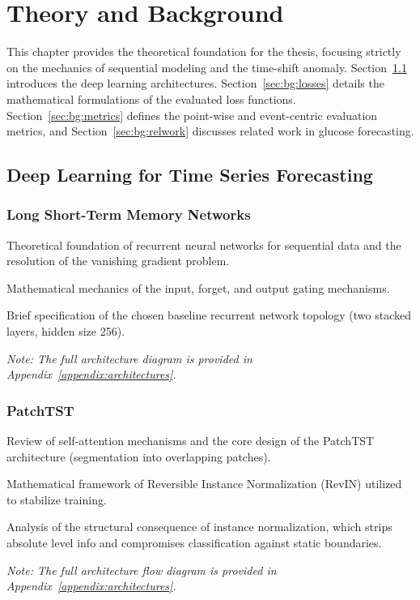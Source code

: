 \chapter{Theory and Background} \label{ch:background}
This chapter provides the theoretical foundation for the thesis, focusing strictly on the mechanics of sequential modeling and the time-shift anomaly. Section~\ref{sec:bg:models} introduces the deep learning architectures. Section~\ref{sec:bg:losses} details the mathematical formulations of the evaluated loss functions. Section~\ref{sec:bg:metrics} defines the point-wise and event-centric evaluation metrics, and Section~\ref{sec:bg:relwork} discusses related work in glucose forecasting.

\section{Deep Learning for Time Series Forecasting} \label{sec:bg:models}
\subsection{Long Short-Term Memory Networks} \label{sec:bg:models:lstm}
\begin{planned}
    \item Theoretical foundation of recurrent neural networks for sequential data and the resolution of the vanishing gradient problem.
    \item Mathematical mechanics of the input, forget, and output gating mechanisms.
    \item Brief specification of the chosen baseline recurrent network topology (two stacked layers, hidden size 256). 
    \item \textit{Note: The full architecture diagram is provided in Appendix~\ref{appendix:architectures}.}
\end{planned}

\subsection{PatchTST} \label{sec:bg:models:patchtst}
\begin{planned}
    \item Review of self-attention mechanisms and the core design of the PatchTST architecture (segmentation into overlapping patches).
    \item Mathematical framework of Reversible Instance Normalization (RevIN) utilized to stabilize training.
    \item Analysis of the structural consequence of instance normalization, which strips absolute level info and compromises classification against static boundaries.
    \item \textit{Note: The full architecture flow diagram is provided in Appendix~\ref{appendix:architectures}.}
\end{planned}

